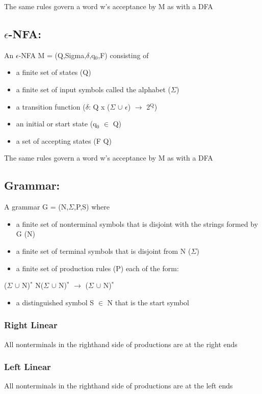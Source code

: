 \documentclass[11pt]{article}
\begin{document}
The same rules govern a word w's acceptance by M as with a DFA

\subsection{$\epsilon$-NFA:}
\label{sec-1-3}
An $\epsilon$-NFA M = (Q,Sigma,$\delta$,q$_{\text{0}}$,F) consisting of
\begin{itemize}
\item a finite set of states (Q)
\item a finite set of input symbols called the alphabet ($\Sigma$)
\item a transition function ($\delta$: Q x ($\Sigma$ $\cup$ $\epsilon$) $\rightarrow$ 2$^{\text{Q}}$)
\item an initial or start state (q$_{\text{0}}$ $\in$ Q)
\item a set of accepting states (F \subseteq Q)
\end{itemize}

The same rules govern a word w's acceptance by M as with a DFA

\subsection{Grammar:}
\label{sec-1-4}
A grammar G = (N,$\Sigma$,P,S) where
\begin{itemize}
\item a finite set of nonterminal symbols that is disjoint with the strings formed by G (N)
\item a finite set of terminal symbols that is disjoint from N ($\Sigma$)
\item a finite set of production rules (P) each of the form:
\end{itemize}
\begin{center}
($\Sigma$ $\cup$ N)$^{\text{*}}$ N($\Sigma$ $\cup$ N)$^{\text{*}}$ $\rightarrow$ ($\Sigma$ $\cup$ N)$^{\text{*}}$
\end{center}
\begin{itemize}
\item a distinguished symbol S $\in$ N that is the start symbol
\end{itemize}

\subsubsection{Right Linear}
\label{sec-1-4-1}
All nonterminals in the righthand side of productions are at the right ends
\subsubsection{Left Linear}
\label{sec-1-4-2}
All nonterminals in the righthand side of productions are at the left ends
\end{document}
